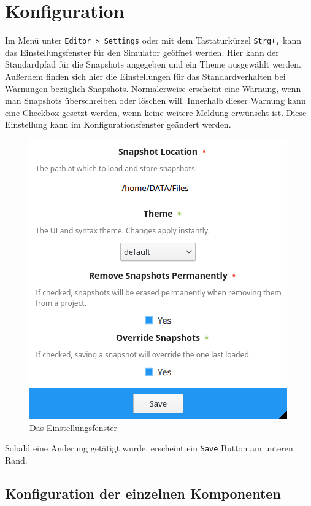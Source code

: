 
\section{Konfiguration}
\label{user-manual-configuration}

Im Menü unter \texttt{Editor > Settings} oder mit dem Tastaturkürzel
\texttt{Strg+,} kann das Einstellungsfenster für den Simulator geöffnet werden.
Hier kann der Standardpfad für die Snapshots angegeben und ein Theme
ausgewählt werden.\\
Außerdem finden sich hier die Einstellungen für das
Standardverhalten bei Warnungen bezüglich Snapshots. Normalerweise erscheint
eine Warnung, wenn man Snapshots überschreiben oder löschen will.  Innerhalb
dieser Warnung kann eine Checkbox gesetzt werden, wenn keine weitere Meldung erwünscht
ist. Diese Einstellung kann im Konfigurationsfenster geändert werden.


\begin{figure}[ht]
	\centering
  \includegraphics[scale=0.9]{Images/Settings}
	\caption{Das Einstellungsfenster}
	\label{Settings}
\end{figure}


Sobald eine Änderung getätigt wurde, erscheint ein \texttt{Save} Button am unteren Rand.


\subsection{Konfiguration der einzelnen Komponenten}

